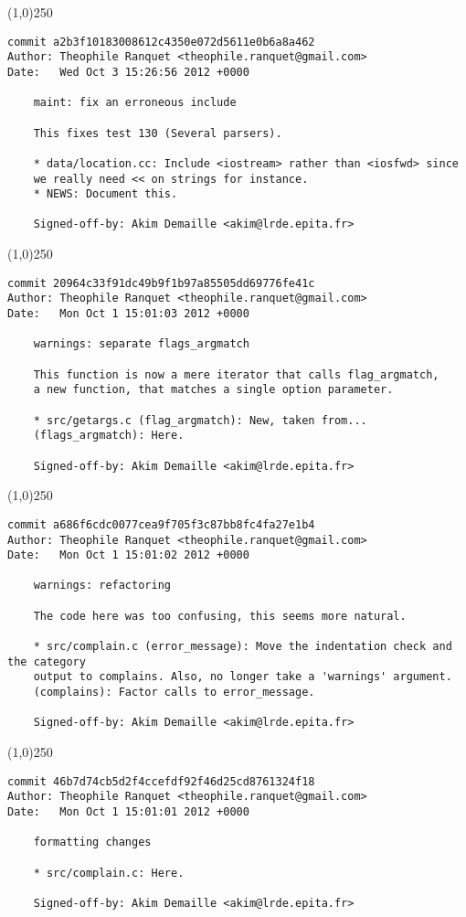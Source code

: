 \line(1,0){250}
\begin{verbatim}
commit a2b3f10183008612c4350e072d5611e0b6a8a462
Author: Theophile Ranquet <theophile.ranquet@gmail.com>
Date:   Wed Oct 3 15:26:56 2012 +0000

    maint: fix an erroneous include
    
    This fixes test 130 (Several parsers).
    
    * data/location.cc: Include <iostream> rather than <iosfwd> since
    we really need << on strings for instance.
    * NEWS: Document this.
    
    Signed-off-by: Akim Demaille <akim@lrde.epita.fr>

\end{verbatim}
\line(1,0){250}
\begin{verbatim}
commit 20964c33f91dc49b9f1b97a85505dd69776fe41c
Author: Theophile Ranquet <theophile.ranquet@gmail.com>
Date:   Mon Oct 1 15:01:03 2012 +0000

    warnings: separate flags_argmatch
    
    This function is now a mere iterator that calls flag_argmatch,
    a new function, that matches a single option parameter.
    
    * src/getargs.c (flag_argmatch): New, taken from...
    (flags_argmatch): Here.
    
    Signed-off-by: Akim Demaille <akim@lrde.epita.fr>

\end{verbatim}
\line(1,0){250}
\begin{verbatim}
commit a686f6cdc0077cea9f705f3c87bb8fc4fa27e1b4
Author: Theophile Ranquet <theophile.ranquet@gmail.com>
Date:   Mon Oct 1 15:01:02 2012 +0000

    warnings: refactoring
    
    The code here was too confusing, this seems more natural.
    
    * src/complain.c (error_message): Move the indentation check and the category
    output to complains. Also, no longer take a 'warnings' argument.
    (complains): Factor calls to error_message.
    
    Signed-off-by: Akim Demaille <akim@lrde.epita.fr>

\end{verbatim}
\line(1,0){250}
\begin{verbatim}
commit 46b7d74cb5d2f4ccefdf92f46d25cd8761324f18
Author: Theophile Ranquet <theophile.ranquet@gmail.com>
Date:   Mon Oct 1 15:01:01 2012 +0000

    formatting changes
    
    * src/complain.c: Here.
    
    Signed-off-by: Akim Demaille <akim@lrde.epita.fr>

\end{verbatim}
